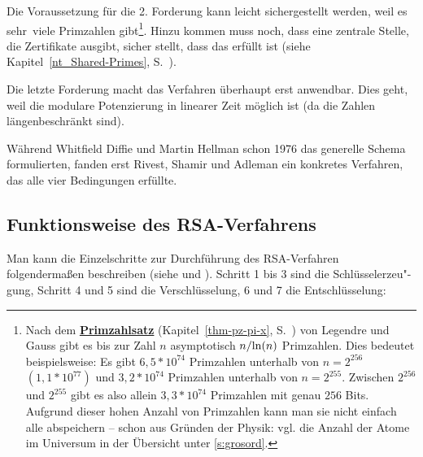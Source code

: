 \begin{refsegment}
Die Voraussetzung für die 2. Forderung kann leicht sichergestellt werden, weil
es \glqq sehr\grqq~viele  Primzahlen gibt\footnote{%
Nach dem \textbf{\hyperlink{thm-pz-pi-x}{Primzahlsatz}}
(Kapitel~\ref{thm-pz-pi-x}, S.~\pageref{thm-pz-pi-x}) von
Legendre und Gauss
gibt es bis zur Zahl $n$ asymptotisch $n/{\rm ln}(n)$ Primzahlen. Dies bedeutet
beispielsweise: Es gibt $6,5*10^{74}$ Primzahlen unterhalb von $n=2^{256}$
$(1,1*10^{77})$ und $3,2*10^{74}$ Primzahlen unterhalb von $n=2^{255}$.
Zwischen $2^{256}$ und $2^{255}$ gibt es also allein $3,3*10^{74}$ Primzahlen
mit genau $256$ Bits. Aufgrund dieser hohen Anzahl von Primzahlen kann man sie
nicht einfach alle abspeichern -- schon aus Gründen der Physik: vgl. die
Anzahl der Atome im Universum in der Übersicht unter \ref{s:grosord}.
}.
Hinzu kommen muss noch, dass eine zentrale Stelle, die Zertifikate ausgibt,
sicher stellt, dass das erfüllt ist (siehe Kapitel~\ref{nt_Shared-Primes},
S.~\pageref{nt_Shared-Primes}).

Die letzte Forderung macht das Verfahren überhaupt erst anwendbar. Dies
geht, weil die modulare Potenzierung in linearer Zeit möglich ist (da die
Zahlen längenbeschränkt sind).

Während Whitfield Diffie und Martin Hellman schon 1976 das generelle Schema
formulierten, fanden erst Rivest, Shamir und Adleman ein konkretes
Verfahren, das alle vier Bedingungen erfüllte.


\hypertarget{RSA}{}
\subsection{Funktionsweise des RSA-Verfahrens}
\label{RSA}
Man kann die Einzelschritte zur Durchführung  des RSA-Verfahren
folgendermaßen beschreiben (siehe \cite[S. 213 ff]{Eckert2014} und
\cite[S. 338 ff]{Sedgewick1990}). 
Schritt 1 bis 3 sind die Schlüsselerzeu"-gung,
Schritt 4 und 5 sind die Verschlüsselung, 6 und 7 die Entschlüsselung:

\begin{itemize}


\end{itemize}
\end{refsegment}
